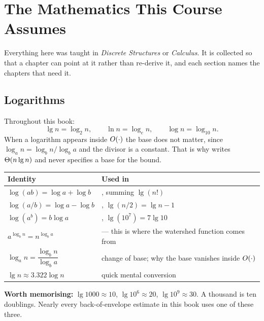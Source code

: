 \chapter{The Mathematics This Course Assumes}\label{app:maths}
\normalfigures

Everything here was taught in \emph{Discrete Structures} or \emph{Calculus}.
It is collected so that a chapter can point at it rather than re-derive it, and
each section names the chapters that need it.

\section{Logarithms}

\begin{definitionbox}[Notation]
Throughout this book:
\[ \lg n = \log_{2} n, \qquad \ln n = \log_{e} n, \qquad
   \log n = \log_{10} n. \]
When a logarithm appears inside $O(\cdot)$ the base does not matter, since
$\log_{a} n = \log_{b} n / \log_{b} a$ and the divisor is a constant. That is
why  writes $\Theta(n\operatorname{lg} n)$ and never specifies a base for the
bound.
\end{definitionbox}

\begin{conceptbox}
\begin{longtable}{@{}L{6.2cm}L{8.3cm}@{}}
\toprule
{}
\textbf{Identity} & \textbf{Used in} \\
\midrule
\endhead
$\log(ab) = \log a + \log b$ & , summing $\lg(n!)$ \\
$\log(a/b) = \log a - \log b$ & , $\lg(n/2) = \lg n - 1$ \\
$\log(a^{b}) = b \log a$ & , $\lg(10^{7}) = 7\lg 10$ \\
$a^{\log_{b} n} = n^{\log_{b} a}$ &  --- this is where the
  watershed function comes from \\
$\log_{a} n = \dfrac{\log_{b} n}{\log_{b} a}$ & change of base; why the base
  vanishes inside $O(\cdot)$ \\
$\lg n \approx 3.322 \log n$ & quick mental conversion \\
\bottomrule
\end{longtable}

\smallskip
\textbf{Worth memorising:} $\lg 1000 \approx 10$, $\lg 10^{6} \approx 20$,
$\lg 10^{9} \approx 30$. A thousand is ten doublings. Nearly every
back-of-envelope estimate in this book uses one of these three.
\end{conceptbox}

